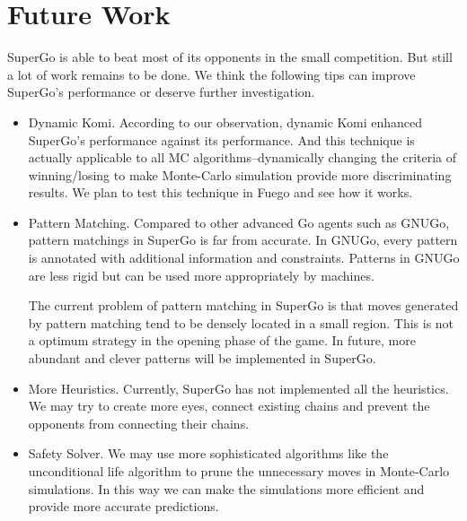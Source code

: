 \section{Future Work}
SuperGo is able to beat most of its opponents in the small competition. But still a lot of work remains to be done. We think the following tips can improve SuperGo's performance or deserve further investigation.

\begin{itemize}
\item Dynamic Komi. According to our observation, dynamic Komi enhanced SuperGo's performance against its performance. And this technique is actually applicable to all MC algorithms--dynamically changing the criteria of winning/losing to make Monte-Carlo simulation provide more discriminating results. We plan to test this technique in Fuego and see how it works.

\item Pattern Matching. Compared to other advanced Go agents such as GNUGo, pattern matchings in SuperGo is far from accurate. In GNUGo\cite{kenchen2004gnugo}, every pattern is annotated with additional information and constraints. Patterns in GNUGo are less rigid but can be used more appropriately by machines. 

The current problem of pattern matching in SuperGo is that moves generated by pattern matching tend to be densely located in a small region. This is not a optimum strategy in the opening phase of the game.
In future, more abundant and clever patterns will be implemented in SuperGo.

\item More Heuristics. Currently, SuperGo has not implemented all the heuristics. We may try to create more eyes, connect existing chains and prevent the opponents from connecting their chains.

\item Safety Solver. We may use more sophisticated algorithms like the unconditional life algorithm to prune the unnecessary moves in Monte-Carlo simulations. In this way we can make the simulations more efficient and provide more accurate predictions. 

\end{itemize}